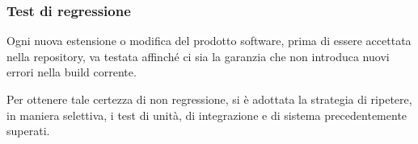 \subsubsection{Test di regressione}\label{testRegressione}
	Ogni nuova estensione o modifica del prodotto software, prima di essere accettata nella repository,
	va testata affinché ci sia la garanzia che non introduca nuovi errori nella build corrente.
	
	Per ottenere tale certezza di non regressione, si è adottata la strategia di ripetere, in maniera selettiva, i test di unità, di integrazione e di sistema
	precedentemente superati.